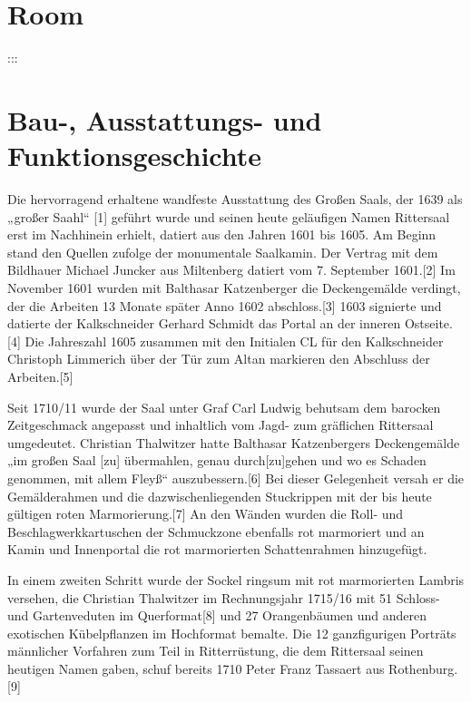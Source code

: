 \documentclass[
  a4paper,
  openany]{book}
\begin{document}
\chapter{Room}\label{room}

:::

\chapter{Bau-, Ausstattungs- und
Funktionsgeschichte}\label{bau--ausstattungs--und-funktionsgeschichte}

Die hervorragend erhaltene wandfeste Ausstattung des Großen Saals, der
1639 als „großer Saahl`` {[}1{]} geführt wurde und seinen heute
geläufigen Namen Rittersaal erst im Nachhinein erhielt, datiert aus den
Jahren 1601 bis 1605. Am Beginn stand den Quellen zufolge der
monumentale Saalkamin. Der Vertrag mit dem Bildhauer Michael Juncker aus
Miltenberg datiert vom 7. September 1601.{[}2{]} Im November 1601 wurden
mit Balthasar Katzenberger die Deckengemälde verdingt, der die Arbeiten
13 Monate später Anno 1602 abschloss.{[}3{]} 1603 signierte und datierte
der Kalkschneider Gerhard Schmidt das Portal an der inneren
Ostseite.{[}4{]} Die Jahreszahl 1605 zusammen mit den Initialen CL für
den Kalkschneider Christoph Limmerich über der Tür zum Altan markieren
den Abschluss der Arbeiten.{[}5{]}

Seit 1710/11 wurde der Saal unter Graf Carl Ludwig behutsam dem barocken
Zeitgeschmack angepasst und inhaltlich vom Jagd- zum gräflichen
Rittersaal umgedeutet. Christian Thalwitzer hatte Balthasar
Katzenbergers Deckengemälde „im großen Saal {[}zu{]} übermahlen, genau
durch{[}zu{]}gehen und wo es Schaden genommen, mit allem Fleyß``
auszubessern.{[}6{]} Bei dieser Gelegenheit versah er die Gemälderahmen
und die dazwischenliegenden Stuckrippen mit der bis heute gültigen roten
Marmorierung.{[}7{]} An den Wänden wurden die Roll- und
Beschlagwerkkartuschen der Schmuckzone ebenfalls rot marmoriert und an
Kamin und Innenportal die rot marmorierten Schattenrahmen hinzugefügt.

In einem zweiten Schritt wurde der Sockel ringsum mit rot marmorierten
Lambris versehen, die Christian Thalwitzer im Rechnungsjahr 1715/16 mit
51 Schloss- und Gartenveduten im Querformat{[}8{]} und 27 Orangenbäumen
und anderen exotischen Kübelpflanzen im Hochformat bemalte. Die 12
ganzfigurigen Porträts männlicher Vorfahren zum Teil in Ritterrüstung,
die dem Rittersaal seinen heutigen Namen gaben, schuf bereits 1710 Peter
Franz Tassaert aus Rothenburg.{[}9{]}
\end{document}
